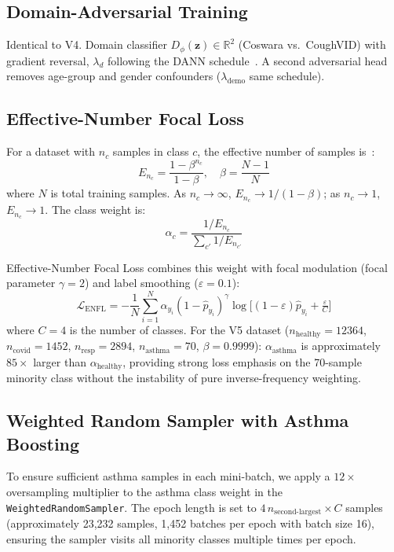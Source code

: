 \documentclass[journal]{IEEEtran}
\newcommand{\R}{\mathbb{R}}
\newcommand{\Lc}{\mathcal{L}}
\begin{document}
\subsection{Domain-Adversarial Training}

Identical to V4. Domain classifier $D_\phi(\mathbf{z})\in\R^2$
(Coswara vs.\ CoughVID) with gradient reversal, $\lambda_d$ following
the DANN schedule~\cite{ganin2016}. A second adversarial head removes
age-group and gender confounders ($\lambda_\text{demo}$ same schedule).

\subsection{Effective-Number Focal Loss}
\label{sec:enfl}

For a dataset with $n_c$ samples in class $c$, the effective number
of samples is~\cite{effectivenum}:
\begin{equation}
E_{n_c} = \frac{1 - \beta^{n_c}}{1 - \beta}, \quad \beta = \frac{N-1}{N}
\label{eq:effnum}
\end{equation}
where $N$ is total training samples. As $n_c\to\infty$, $E_{n_c}\to 1/(1-\beta)$;
as $n_c\to 1$, $E_{n_c}\to 1$. The class weight is:
\begin{equation}
\alpha_c = \frac{1/E_{n_c}}{\sum_{c'} 1/E_{n_{c'}}}
\label{eq:enfw}
\end{equation}

Effective-Number Focal Loss combines this weight with focal
modulation (focal parameter $\gamma{=}2$) and label smoothing
($\varepsilon{=}0.1$):
\begin{equation}
\Lc_\text{ENFL} = -\frac{1}{N}\sum_{i=1}^N
\alpha_{y_i}(1-\hat{p}_{y_i})^\gamma
\log\!\bigl[(1-\varepsilon)\hat{p}_{y_i}
  + \tfrac{\varepsilon}{C}\bigr]
\label{eq:enfl}
\end{equation}
where $C{=}4$ is the number of classes. For the V5 dataset
($n_\text{healthy}{=}12364$, $n_\text{covid}{=}1452$,
$n_\text{resp}{=}2894$, $n_\text{asthma}{=}70$, $\beta{=}0.9999$):
$\alpha_\text{asthma}$ is approximately $85{\times}$ larger than
$\alpha_\text{healthy}$, providing strong loss emphasis on the
70-sample minority class without the instability of pure
inverse-frequency weighting.

\subsection{Weighted Random Sampler with Asthma Boosting}

To ensure sufficient asthma samples in each mini-batch,
we apply a $12{\times}$ oversampling multiplier to the asthma
class weight in the \texttt{WeightedRandomSampler}. The epoch
length is set to $4\,n_\text{second-largest} \times C$ samples
(approximately 23,232 samples, 1,452 batches per epoch with
batch size 16), ensuring the sampler visits all minority
classes multiple times per epoch.
\end{document}

